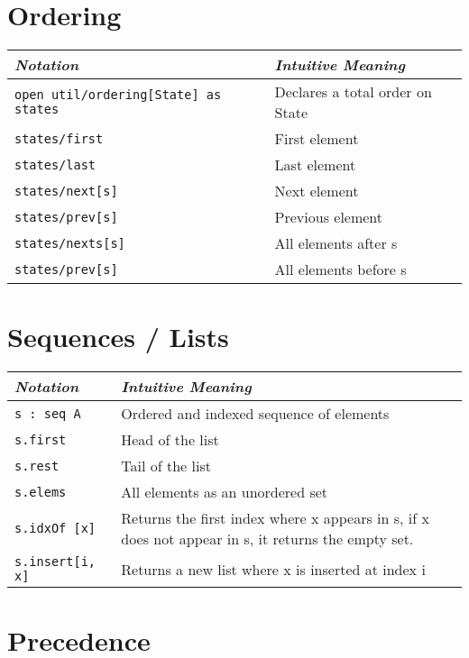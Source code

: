 \documentclass{article}
\newlength\tw
\begin{document}
\section{Ordering}

\begin{longtable}{|p{\tw}|p{\tw}|}
\hline
\emph{Notation} & \emph{Intuitive Meaning} \\
\hline
\texttt{open util/ordering[State] as states} & Declares a total order on State\\
\hline
\texttt{states/first} & First element\\
\hline
\texttt{states/last} & Last element\\
\hline
\texttt{states/next[s]} & Next element\\
\hline
\texttt{states/prev[s]} & Previous element\\
\hline
\texttt{states/nexts[s]} & All elements after s\\
\hline
\texttt{states/prev[s]} & All elements before s\\
\hline
\end{longtable}

\section{Sequences / Lists}
\begin{longtable}{|p{\tw}|p{\tw}|}
\hline
\emph{Notation} & \emph{Intuitive Meaning} \\
\hline
\texttt{s : seq A} & Ordered and indexed sequence of elements\\
\hline
\texttt{s.first} & Head of the list\\
\hline
\texttt{s.rest} & Tail of the list\\
\hline
\texttt{s.elems} & All elements as an unordered set\\
\hline
\texttt{s.idxOf [x]} & Returns the first index where x appears in s, if x does not appear in s, it returns the empty set.\\
\hline
\texttt{s.insert[i, x]} &  Returns a new list where x is inserted at index i\\
\hline
\end{longtable}

\newpage
\section{Precedence}
\end{document}
